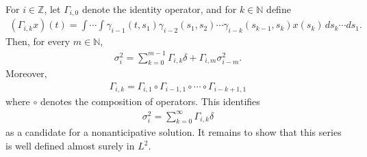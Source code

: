 \documentclass[12pt,a4paper]{article}
\theoremstyle{definition}
\begin{document}
For \(i\in\mathbb Z\), let \(\Gamma_{i,0}\) denote the identity operator, and for \(k\in\mathbb N\) define
\begin{gather}
    (\Gamma_{i,k}x)(t)
    =
    \int\cdots\int
    \gamma_{i-1}(t,s_1)\gamma_{i-2}(s_1,s_2)\cdots\gamma_{i-k}(s_{k-1},s_k)x(s_k)\,ds_k\cdots ds_1 .
\end{gather}
Then, for every \(m\in\mathbb N\),
\begin{gather}
    \sigma_i^2=\sum_{k=0}^{m-1}\Gamma_{i,k}\delta+\Gamma_{i,m}\sigma_{i-m}^2 .
\end{gather}
Moreover,
\begin{align}
\label{CompositionOperator}
    \Gamma_{i,k}
    =\Gamma_{i,1}\circ\Gamma_{i-1,1}\circ\cdots\circ\Gamma_{i-k+1,1}
\end{align}
where $\circ$ denotes the composition of operators.
This identifies
\begin{gather}
    \sigma_i^2=\sum_{k=0}^\infty \Gamma_{i,k}\delta
\end{gather}
as a candidate for a nonanticipative solution. It remains to show that this series is well defined almost surely in \(L^2\).
\end{document}
